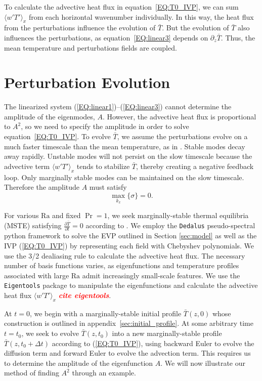 \documentclass[reprint,amsmath,amssymb,aps]{revtex4-1}
\newcommand{\note}[1]{\noindent \textbf{\textit{\textcolor{Red}{#1}}}}
\newcommand\Ra{\mathrm{Ra}}
\newcommand{\eq}[1]{(\ref{#1})}
\newcommand{\eqss}[2]{(\ref{#1})--(\ref{#2})}
\begin{document}
To calculate the advective heat flux in equation~\ref{EQ:T0_IVP}, we can sum $\langle w'T' \rangle_x$ from each horizontal wavenumber individually.
In this way, the heat flux from the perturbations influence the evolution of $\bar{T}$.
But the evolution of $\bar{T}$ also influences the perturbations, as equation~\ref{EQ:linear3} depends on $\partial_z \bar{T}$.
Thus, the mean temperature and perturbations fields are coupled.

\section{Perturbation Evolution}\label{sec:evolution}
The linearized system \eqss{EQ:linear1}{EQ:linear3} cannot determine the amplitude of the eigenmodes, $A$.
However, the advective heat flux is proportional to $A^2$, so we need to specify the amplitude in order to solve equation~\ref{EQ:T0_IVP}.
To evolve $\bar{T}$, we assume the perturbations evolve on a much faster timescale than the mean temperature, as in \cite{michel_chini_2019}.
Stable modes decay away rapidly. 
Unstable modes will not persist on the slow timescale because the advective term $\langle w'T' \rangle_x$ tends to stabilize $\bar{T}$, thereby creating a negative feedback loop.
Only marginally stable modes can be maintained on the slow timescale.
Therefore the amplitude $A$ must satisfy
\begin{equation}
    \max_{k_x} \{ \sigma \} = 0.
\end{equation}

For various $\Ra$ and fixed $\Pr = 1$, we seek marginally-stable thermal equilibria (MSTE) satisfying $\frac{\partial \bar{T}}{\partial t} = 0$ according to . 
We employ the \texttt{Dedalus} pseudo-spectral python framework \cite{Dedalus_2020} to solve the EVP outlined in Section \ref{sec:model} as well as the IVP \eq{EQ:T0_IVP} by representing each field with Chebyshev polynomials.
We use the 3/2 dealiasing rule to calculate the advective heat flux.
The necessary number of basis functions varies, as eigenfunctions and temperature profiles associated with large $\Ra$ admit increasingly small-scale features. 
We use the \texttt{Eigentools} package to manipulate the eigenfunctions and calculate the advective heat flux $\langle w' T' \rangle_x$ \note{cite eigentools}.

At $t = 0$, we begin with a marginally-stable initial profile $\bar{T}(z, 0)$ whose construction is outlined in appendix~\ref{sec:initial_profile}. 
At some arbitrary time $t = t_0$, we seek to evolve $\bar{T}(z, t_0)$ into a new marginally-stable profile $\bar{T}(z, t_0 + \Delta t)$ according to \eq{EQ:T0_IVP}, using backward Euler to evolve the diffusion term and forward Euler to evolve the advection term. 
This requires us to determine the amplitude of the eigenfunction $A$.
We will now illustrate our method of finding $A^2$ through an example.
\end{document}
